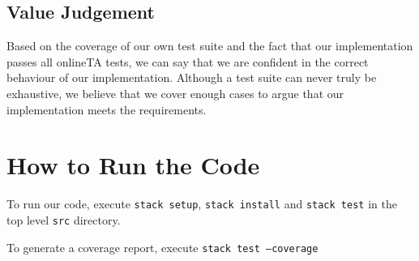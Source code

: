 \documentclass{article}
\begin{document}
\subsection{Value Judgement}
Based on the coverage of our own test suite and the fact that our implementation passes all onlineTA tests, we can say that we are confident in the correct behaviour of our implementation. Although a test suite can never truly be exhaustive, we believe that we cover enough cases to argue that our implementation meets the requirements.

\section{How to Run the Code}
To run our code, execute \texttt{stack setup}, \texttt{stack install} and \texttt{stack test} in the top level \texttt{src} directory.

To generate a coverage report, execute \texttt{stack test --coverage}
\end{document}
